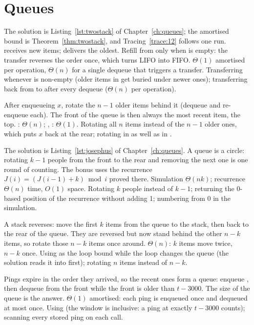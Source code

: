 \section{Queues}

The solution is Listing~\ref{lst:twostack} of Chapter~\ref{ch:queues}; the amortised
bound is Theorem~\ref{thm:twostack}, and Tracing~\ref{trace:12} follows one run.
\idea {} receives new items;  delivers the oldest. Refill  from
 only when  is empty: the transfer reverses the order once, which turns
LIFO into FIFO.
\complexity $\Theta(1)$ amortised per operation, $\Theta(n)$ for a single dequeue that
triggers a transfer.
\mistakes Transferring whenever  is non-empty (older items in  get buried
under newer ones); transferring back from  to  after every dequeue
($\Theta(n)$ per operation).

\idea After enqueueing $x$, rotate the $n-1$ older items behind it (dequeue and
re-enqueue each). The front of the queue is then always the most recent item, the top.
\complexity {}: $\Theta(n)$; , : $\Theta(1)$.
\mistakes Rotating all $n$ items instead of the $n-1$ older ones, which puts $x$ back at
the rear; rotating in  as well as in .

The solution is Listing~\ref{lst:josephus} of Chapter~\ref{ch:queues}.
\idea A queue is a circle: rotating $k-1$ people from the front to the rear and removing
the next one is one round of counting. The bonus uses the recurrence
$J(i)=(J(i-1)+k)\bmod i$ proved there.
\complexity Simulation $\Theta(nk)$; recurrence $\Theta(n)$ time, $O(1)$ space.
\mistakes Rotating $k$ people instead of $k-1$; returning the 0-based position of the
recurrence without adding 1; numbering from 0 in the simulation.

\idea A stack reverses: move the first $k$ items from the queue to the stack, then back
to the rear of the queue. They are reversed but now stand behind the other $n-k$ items,
so rotate those $n-k$ items once around.
\complexity $\Theta(n)$: $k$ items move twice, $n-k$ once.
\mistakes Using  as the loop bound while the loop changes the queue (the
solution reads it into  first); rotating $n$ items instead of $n-k$.

\idea Pings expire in the order they arrived, so the recent ones form a queue: enqueue
, then dequeue from the front while the front is older than $t-3000$. The size of
the queue is the answer.
\complexity $\Theta(1)$ amortised: each ping is enqueued once and dequeued at most once.
\mistakes Using \cc{<=} (the window is inclusive: a ping at exactly $t-3000$ counts);
scanning every stored ping on each call.

